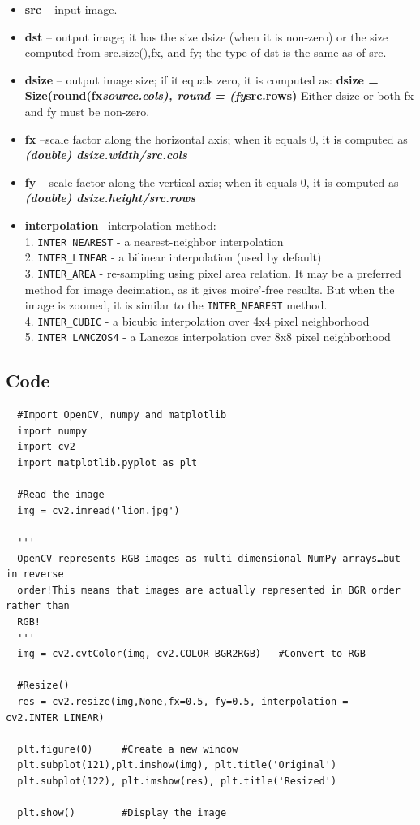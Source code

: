 \documentclass[]{article}
\providecommand{\tightlist}{%
  \setlength{\itemsep}{0pt}\setlength{\parskip}{0pt}}
\begin{document}
\begin{itemize}
\tightlist
\item
  \textbf{src} -- input image.
\item
  \textbf{dst} -- output image; it has the size dsize (when it is
  non-zero) or the size computed from src.size(),fx, and fy; the type of
  dst is the same as of src.
\item
  \textbf{dsize} -- output image size; if it equals zero, it is computed
  as: \textbf{dsize = Size(round(fx\emph{source.cols), round =
  (fy}src.rows)} Either dsize or both fx and fy must be non-zero.
\item
  \textbf{fx} --scale factor along the horizontal axis; when it equals
  0, it is computed as\\
   \emph{\textbf{(double) dsize.width/src.cols}}
\item
  \textbf{fy} -- scale factor along the vertical axis; when it equals 0,
  it is computed as\\
  \emph{\textbf{(double) dsize.height/src.rows}}
\item
  \textbf{interpolation} --interpolation method:\\
   1. \texttt{INTER\_NEAREST} - a nearest-neighbor interpolation\\
   2. \texttt{INTER\_LINEAR} - a bilinear interpolation (used by
  default)\\
   3. \texttt{INTER\_AREA} - re-sampling using pixel area relation. It
  may be a preferred method for image decimation, as it gives
  moire'-free results. But when the image is zoomed, it is similar to
  the \texttt{INTER\_NEAREST} method.\\
   4. \texttt{INTER\_CUBIC} - a bicubic interpolation over 4x4 pixel
  neighborhood\\
   5. \texttt{INTER\_LANCZOS4} - a Lanczos interpolation over 8x8 pixel
  neighborhood
\end{itemize}

\subsection{Code}\label{code}

\begin{verbatim}
  #Import OpenCV, numpy and matplotlib
  import numpy
  import cv2
  import matplotlib.pyplot as plt

  #Read the image
  img = cv2.imread('lion.jpg')

  '''
  OpenCV represents RGB images as multi-dimensional NumPy arrays…but in reverse
  order!This means that images are actually represented in BGR order rather than
  RGB!
  '''
  img = cv2.cvtColor(img, cv2.COLOR_BGR2RGB)   #Convert to RGB

  #Resize()
  res = cv2.resize(img,None,fx=0.5, fy=0.5, interpolation = cv2.INTER_LINEAR)

  plt.figure(0)     #Create a new window
  plt.subplot(121),plt.imshow(img), plt.title('Original')
  plt.subplot(122), plt.imshow(res), plt.title('Resized')

  plt.show()        #Display the image
\end{verbatim}
\end{document}
